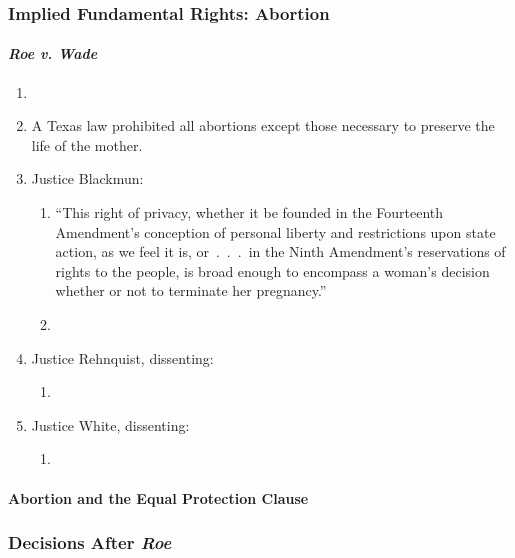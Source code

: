 \subsubsection{Implied Fundamental Rights: Abortion}
 
\paragraph{\emph{Roe v. Wade}}
 
\begin{enumerate}
    \item %
    \item A Texas law prohibited all abortions except those necessary to 
    preserve the life of the mother.
    \item Justice Blackmun:
    \begin{enumerate}
        \item ``This right of privacy, whether it be founded in the Fourteenth 
        Amendment's conception of personal liberty and restrictions upon state 
        action, as we feel it is, or~.~.~.~in the Ninth Amendment's 
        reservations of rights to the people, is broad enough to encompass a 
        woman's decision whether or not to terminate her pregnancy.''
        \item %
    \end{enumerate}
    \item Justice Rehnquist, dissenting: %
    \begin{enumerate}
        \item 
    \end{enumerate}
    \item Justice White, dissenting: %
    \begin{enumerate}
        \item 
    \end{enumerate}
\end{enumerate}
 
\paragraph{Abortion and the Equal Protection Clause}
 
 
\subsubsection{Decisions After \emph{Roe}}
 
